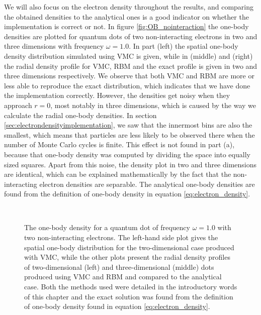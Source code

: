 We will also focus on the electron density throughout the results, and comparing the obtained densities to the analytical ones is a good indicator on whether the implementation is correct or not. In figure \eqref{fig:OB_nointeraction} the one-body densities are plotted for quantum dots of two non-interacting electrons in two and three dimensions with frequency $\omega=1.0$. In part (left) the spatial one-body density distribution simulated using VMC is given, while in (middle) and (right) the radial density profile for VMC, RBM and the exact profile is given in two and three dimensions respectively. We observe that both VMC and RBM are more or less able to reproduce the exact distribution, which indicates that we have done the implementation correctly. However, the densities get noisy when they approach $r=0$, most notably in three dimensions, which is caused by the way we calculate the radial one-body densities. In section \ref{sec:electrondensityimplementation}, we saw that the innermost bins are also the smallest, which means that particles are less likely to be observed there when the number of Monte Carlo cycles is finite. This effect is not found in part (a), because that one-body density was computed by dividing the space into equally sized squares. Apart from this noise, the density plot in two and three dimensions are identical, which can be explained mathematically by the fact that the non-interacting electron densities are separable. The analytical one-body densities are found from the definition of one-body density in equation \eqref{eq:electron_density}.

\begin{figure}
	\centering
	\captionsetup[subfigure]{labelformat=empty}
	\\
	
	\caption{The one-body density for a quantum dot of frequency $\omega=1.0$ with two non-interacting electrons. The left-hand side plot gives the spatial one-body distribution for the two-dimensional case produced with VMC, while the other plots present the radial density profiles of two-dimensional (left) and three-dimensional (middle) dots produced using VMC and RBM and compared to the analytical case. Both the methods used were detailed in the introductory words of this chapter and the exact solution was found from the definition of one-body density found in equation \eqref{eq:electron_density}.}
	\label{fig:OB_nointeraction}
\end{figure}

